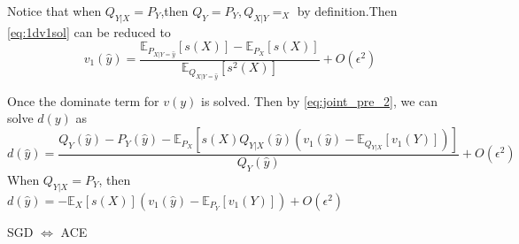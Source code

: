 \documentclass{article}
\DeclareMathOperator{\diag}{diag}
\def\T{\mathrm{T}}
\def\E{\mathbb{E}}
\begin{document}
Notice that when $Q_{Y|X}=P_Y$,then $Q_Y=P_Y,Q_{X|Y}=_X$ by definition.Then \eqref{eq:1dv1sol} can be reduced to
\begin{equation}
v_1(\hat{y})= \frac{\E_{P_{X|Y=\hat{y}}}[s(X)]-\E_{P_X}[s(X)]}{\E_{Q_{X|Y=\hat{y}}}[s^2(X)]}+O(\epsilon^2)
\end{equation}

Once the dominate term for $v(y)$ is solved. Then by \eqref{eq:joint_pre_2}, we can solve $d(y)$ as 
\begin{equation}\label{eq:1dd}
d(\hat{y})=\frac{Q_Y(\hat{y})-P_Y(\hat{y})-\E_{P_X}\left[s(X)Q_{Y|X}(\hat{y})(v_1(\hat{y})-\E_{Q_{Y|X}}[v_1(Y)])\right]}{Q_Y(\hat{y})}+O(\epsilon^2)
\end{equation}
When $Q_{Y|X}=P_Y$, then $d(\hat{y})=-\E_X[s(X)](v_1(\hat{y})-\E_{P_Y}[v_1(Y)])+O(\epsilon^2)$

SGD $\iff$ ACE
 
\end{document}
